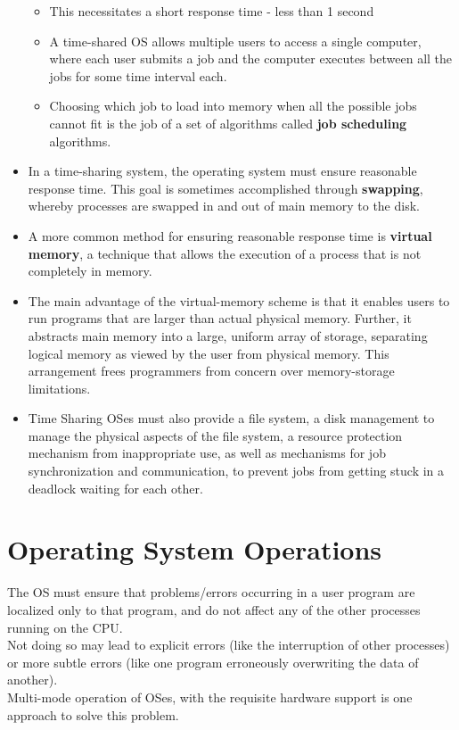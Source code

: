\documentclass{article}
\theoremstyle{plain}
\theoremstyle{definition}
\begin{document}
\begin{itemize}
\begin{itemize}
        \item This necessitates a short response time - less than 1 second
        
        \item A time-shared OS allows multiple users to access a single computer, where each user submits a job and the computer executes between all the jobs for some time interval each. 
        
        \item Choosing which job to load into memory when all the possible jobs cannot fit is the job of a set of algorithms called \textbf{job scheduling} algorithms.
    \end{itemize}
    
    \item In a time-sharing system, the operating system must ensure reasonable response time. This goal is sometimes accomplished through \textbf{swapping}, whereby processes are swapped in and out of main memory to the disk. 
    
    \item A more common method for ensuring reasonable response time is \textbf{virtual memory}, a technique that allows the execution of a process that is not completely in memory. 
    
    \item The main advantage of the virtual-memory scheme is that it enables users to run programs that are larger than actual physical memory. Further, it abstracts main memory into a large, uniform array of storage, separating logical memory as viewed by the user from physical memory. This arrangement frees programmers from concern over memory-storage limitations.
    
    \item Time Sharing OSes must also provide a file system, a disk management to manage the physical aspects of the file system, a resource protection mechanism from inappropriate use, as well as mechanisms for job synchronization and communication, to prevent jobs from getting stuck in a deadlock waiting for each other.
\end{itemize}

\section{Operating System Operations}
The OS must ensure that problems/errors occurring in a user program are localized only to that program, and do not affect any of the other processes running on the CPU.\\
Not doing so may lead to explicit errors (like the interruption of other processes) or more subtle errors (like one program erroneously overwriting the data of another).\\
Multi-mode operation of OSes, with the requisite hardware support is one approach to solve this problem.
\end{document}

